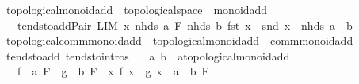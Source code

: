 \begin{isabellebody}
\endisatagproof
{\isafoldproof}%
%
\isadelimproof
%
\endisadelimproof
%
\isadelimdocument
%
\endisadelimdocument
%
\isatagdocument
%
\isamarkuptrue%
%
\endisatagdocument
{\isafolddocument}%
%
\isadelimdocument
%
\endisadelimdocument
{}\isamarkupfalse%
\ topological{\isacharunderscore}{\kern0pt}monoid{\isacharunderscore}{\kern0pt}add\ {\isacharequal}{\kern0pt}\ topological{\isacharunderscore}{\kern0pt}space\ {\isacharplus}{\kern0pt}\ monoid{\isacharunderscore}{\kern0pt}add\ {\isacharplus}{\kern0pt}\isanewline
\ \ \ tendsto{\isacharunderscore}{\kern0pt}add{\isacharunderscore}{\kern0pt}Pair{\isacharcolon}{\kern0pt}\ {\isachardoublequoteopen}LIM\ x\ {\isacharparenleft}{\kern0pt}nhds\ a\ {\isasymtimes}\isactrlsub F\ nhds\ b{\isacharparenright}{\kern0pt}{\isachardot}{\kern0pt}\ fst\ x\ {\isacharplus}{\kern0pt}\ snd\ x\ {\isacharcolon}{\kern0pt}{\isachargreater}{\kern0pt}\ nhds\ {\isacharparenleft}{\kern0pt}a\ {\isacharplus}{\kern0pt}\ b{\isacharparenright}{\kern0pt}{\isachardoublequoteclose}\isanewline
\isanewline
{}\isamarkupfalse%
\ topological{\isacharunderscore}{\kern0pt}comm{\isacharunderscore}{\kern0pt}monoid{\isacharunderscore}{\kern0pt}add\ {\isacharequal}{\kern0pt}\ topological{\isacharunderscore}{\kern0pt}monoid{\isacharunderscore}{\kern0pt}add\ {\isacharplus}{\kern0pt}\ comm{\isacharunderscore}{\kern0pt}monoid{\isacharunderscore}{\kern0pt}add\isanewline
\isanewline
{}\isamarkupfalse%
\ tendsto{\isacharunderscore}{\kern0pt}add\ {\isacharbrackleft}{\kern0pt}tendsto{\isacharunderscore}{\kern0pt}intros{\isacharbrackright}{\kern0pt}{\isacharcolon}{\kern0pt}\isanewline
\ \ \ a\ b\ {\isacharcolon}{\kern0pt}{\isacharcolon}{\kern0pt}\ {\isachardoublequoteopen}{\isacharprime}{\kern0pt}a{\isacharcolon}{\kern0pt}{\isacharcolon}{\kern0pt}topological{\isacharunderscore}{\kern0pt}monoid{\isacharunderscore}{\kern0pt}add{\isachardoublequoteclose}\isanewline
\ \ \ {\isachardoublequoteopen}{\isacharparenleft}{\kern0pt}f\ {\isasymlonglongrightarrow}\ a{\isacharparenright}{\kern0pt}\ F\ {\isasymLongrightarrow}\ {\isacharparenleft}{\kern0pt}g\ {\isasymlonglongrightarrow}\ b{\isacharparenright}{\kern0pt}\ F\ {\isasymLongrightarrow}\ {\isacharparenleft}{\kern0pt}{\isacharparenleft}{\kern0pt}{\isasymlambda}x{\isachardot}{\kern0pt}\ f\ x\ {\isacharplus}{\kern0pt}\ g\ x{\isacharparenright}{\kern0pt}\ {\isasymlonglongrightarrow}\ a\ {\isacharplus}{\kern0pt}\ b{\isacharparenright}{\kern0pt}\ F{\isachardoublequoteclose}\isanewline
%
\isadelimproof

\end{isabellebody}
